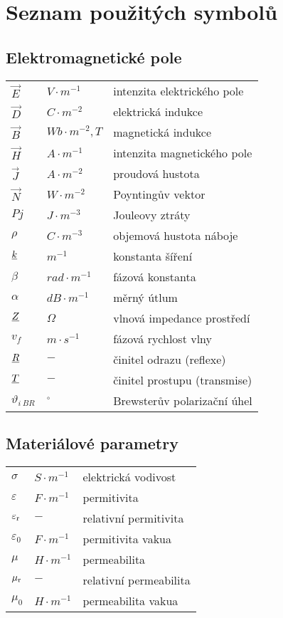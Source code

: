 \chapter*{Seznam použitých symbolů}

\section*{Elektromagnetické pole}
\begin{tabular}{lll}
	$\vec{E}$ 	& $\unit{V\cdot m^{-1}}$ 	& intenzita elektrického pole\\
	$\vec{D}$ 	& $\unit{C\cdot m^{-2}}$ 	& elektrická indukce\\
	$\vec{B}$ 	& $\unit{Wb\cdot m^{-2}},\unit{T}$ & magnetická indukce\\
	$\vec{H}$ 	& $\unit{A\cdot m^{-1}}$ 	& intenzita magnetického pole\\
    $\vec{J}$ 	& $\unit{A\cdot m^{-2}}$ 	& proudová hustota\\
    $\vec{N}$ 	& $\unit{W\cdot m^{-2}}$ 	& Poyntingův vektor\\
    $P{j}$ 		& $\unit{J\cdot m^{-3}}$ 	& Jouleovy ztráty\\
	$\rho$		& $\unit{C\cdot m^{-3}}$	& objemová hustota náboje\\
    ${\underline{k}}$ 	& $\unit{m^{-1}}$ 			& konstanta šíření\\
    $\beta$		& $\unit{rad\cdot m^{-1}}$	& fázová konstanta\\
    $\alpha$	& $\unit{dB\cdot m^{-1}}$	& měrný útlum\\
    ${\underline{Z}}$	& $\unit{\Omega}$			& vlnová impedance prostředí\\
    $v_{f}$	    & $\unit{m\cdot s^{-1}}$	& fázová rychlost vlny\\
    ${\underline{R}}$ 	& $\unit{-}$ 				& činitel odrazu (reflexe)\\   
    ${\underline{T}}$ 	& $\unit{-}$ 				& činitel prostupu (transmise)\\
    $\vartheta_{i\ BR}$ & $\unit{^{\circ}}$	& Brewsterův polarizační úhel\\
\end{tabular}

\section*{Materiálové parametry}
\begin{tabular}{lll}
	$\sigma$ & $\unit{S\cdot m^{-1}}$ & elektrická vodivost\\
	$\varepsilon$ & $\unit{F\cdot m^{-1}}$ & permitivita\\
	$\varepsilon_{\rm{r}}$ & $\unit{-}$ & relativní permitivita\\
    $\varepsilon_0$ & $\unit{F\cdot m^{-1}}$ & permitivita vakua\\
	$\mu$ & $\unit{H\cdot m^{-1}}$ & permeabilita\\
	$\mu_{\rm{r}}$ & $\unit{-}$ & relativní permeabilita\\
	$\mu_0$ & $\unit{H\cdot m^{-1}}$ & permeabilita vakua\\
\end{tabular}

